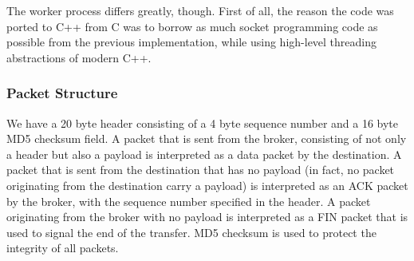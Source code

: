 \documentclass[conference]{IEEEtran}
\begin{document}
The worker process differs greatly, though. First of all, the reason the code was
ported to C++ from C was to borrow as much socket programming code as possible
from the previous implementation, while using high-level threading abstractions of modern C++.

\subsubsection{Packet Structure}
We have a 20 byte header consisting of a 4 byte sequence number and a 16 byte MD5 checksum field.
A packet that is sent from the broker, consisting of not only a header but also a payload
is interpreted as a data packet by the destination. A packet that is sent from
the destination that has no payload (in fact, no packet originating from the destination carry a payload)
is interpreted as an ACK packet by the broker, with the sequence number specified in the header.
A packet originating from the broker with no payload is interpreted as a FIN packet
that is used to signal the end of the transfer. MD5 checksum is used to protect the
integrity of all packets.
\end{document}
